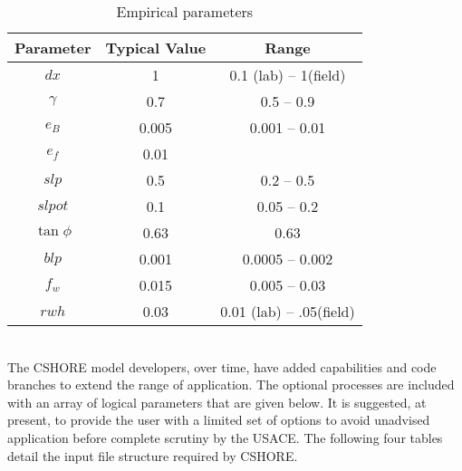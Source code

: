 \documentclass[11pt,oneside]{book}
\begin{document}
\begin{table}[h]
\begin{center}
\begin{tabular}{||c|c|c||}\hline
Parameter& Typical Value   & Range  \\ \hline \hline
$dx$ & 1 & 0.1 (lab) -- 1(field) \\ \hline
$\gamma$ & 0.7 & 0.5 -- 0.9 \\ \hline
$e_{B}$ & 0.005 & 0.001 -- 0.01 \\ \hline
$e_{f}$ & 0.01 &  \\ \hline
$slp$ & 0.5 & 0.2 -- 0.5 \\ \hline
$slpot$ & 0.1 & 0.05 -- 0.2 \\ \hline
$\tan \phi$ & 0.63 & 0.63 \\ \hline
$blp$ & 0.001 & 0.0005 -- 0.002 \\ \hline
$f_w$ & 0.015 & 0.005 -- 0.03 \\ \hline
$rwh$ & 0.03 & 0.01 (lab) -- .05(field) \\ \hline
\end{tabular}
\end{center}
\caption{Empirical  parameters}
\label{fig1}
\end{table}
\clearpage
{}\\ The CSHORE model developers,
over time, have added capabilities and code branches to extend the
range of application.  The optional processes are included with an
array of logical parameters that are given below.  It is suggested, at
present, to provide the user with a limited set of options to avoid
unadvised application before complete scrutiny by the USACE.  The
following four tables detail the input file structure required by
CSHORE.  
\end{document}
